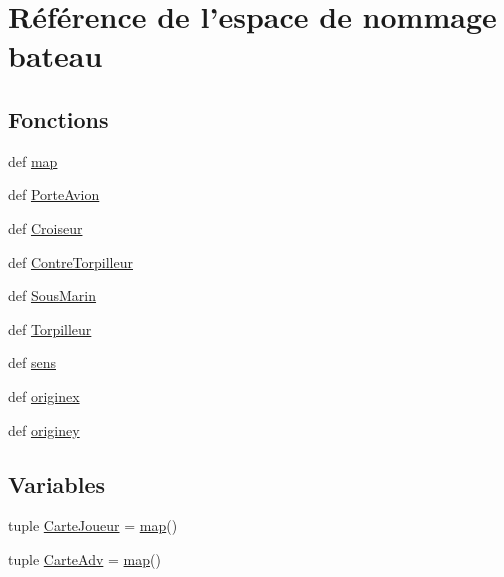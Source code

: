 \hypertarget{namespacebateau}{\section{Référence de l'espace de nommage bateau}
\label{namespacebateau}
}
\subsection*{Fonctions}
\begin{DoxyCompactItemize}
\item 
def \hyperlink{namespacebateau_a2f0e2fb6690af90fd1cd510e132a041c}{map}
\item 
def \hyperlink{namespacebateau_ad2ef327d271e5ebe5426fe6d58fa0cea}{Porte\-Avion}
\item 
def \hyperlink{namespacebateau_a472c5b7bcdfb78f0e7388a197a25129a}{Croiseur}
\item 
def \hyperlink{namespacebateau_a91714c8dcf7e649256b4abd289176d58}{Contre\-Torpilleur}
\item 
def \hyperlink{namespacebateau_ae08b97eef04ed71124cda74053ad0a36}{Sous\-Marin}
\item 
def \hyperlink{namespacebateau_a875c36de98747c833df6a8c648f0ced3}{Torpilleur}
\item 
def \hyperlink{namespacebateau_aa9dece4300bcd47e6e67cdaa52fa2cce}{sens}
\item 
def \hyperlink{namespacebateau_ad1217acc7738157178dae5d246b019db}{originex}
\item 
def \hyperlink{namespacebateau_a2b16dc7153e94407fdbb3c8d4a152a84}{originey}
\end{DoxyCompactItemize}
\subsection*{Variables}
\begin{DoxyCompactItemize}
\item 
tuple \hyperlink{namespacebateau_a924cee8dc4435fc03e905904c31dbcf7}{Carte\-Joueur} = \hyperlink{namespacebateau_a2f0e2fb6690af90fd1cd510e132a041c}{map}()
\item 
tuple \hyperlink{namespacebateau_a50dc5f1cd8aae1c80cfd24007c44dd9c}{Carte\-Adv} = \hyperlink{namespacebateau_a2f0e2fb6690af90fd1cd510e132a041c}{map}()
\end{DoxyCompactItemize}


